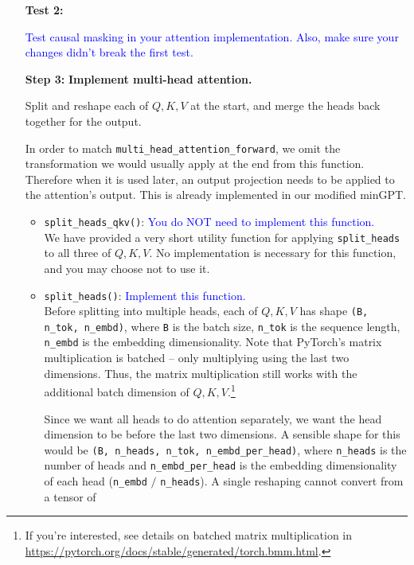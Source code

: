 \documentclass{article}
\begin{document}
\begin{enumerate}
        \item[\textbf{Test 2:}]

        \textcolor{blue}{Test causal masking in your attention implementation. Also, make sure your changes didn't break the first test.}
        
        \item[\textbf{Step 3:}] 
        \textbf{Implement multi-head attention.}
        
        Split and reshape each of $Q,K,V$ at the start, and merge the heads back
        together for the output.
        
        In order to match \verb|multi_head_attention_forward|, we omit the
        transformation we would usually apply at the end from this function.
        Therefore when it is used later, an output projection needs to be
        applied to the attention's output. This is already implemented in our
        modified minGPT.


        \begin{itemize}
        \item \verb|split_heads_qkv()|: \textcolor{blue}{You do NOT need to
        implement this function.} \\
        We have provided a very short utility function for applying
        \verb|split_heads| to all three of $Q, K, V$. No implementation is
        necessary for this function, and you may choose not to use it.
        
        \item \verb|split_heads()|: \textcolor{blue}{Implement this function.}
        \\
        Before splitting into multiple heads, each of $Q,K,V$ has shape
        \verb|(B, n_tok, n_embd)|, where \verb|B| is the batch size,
        \verb|n_tok| is the sequence length, \verb|n_embd| is the embedding
        dimensionality. Note that PyTorch's matrix multiplication is batched --
        only multiplying using the last two dimensions. Thus, the matrix
        multiplication still works with the additional batch dimension of
        $Q,K,V$.\footnote{If you're interested, see details on batched matrix
        multiplication in
        \url{https://pytorch.org/docs/stable/generated/torch.bmm.html}.}
        
        Since we want all heads to do attention separately, we want the head
        dimension to be before the last two dimensions. A sensible shape for
        this would be \verb|(B, n_heads, n_tok, n_embd_per_head)|, where
        \verb|n_heads| is the number of heads and \verb|n_embd_per_head| is the
        embedding dimensionality of each head (\verb|n_embd| $/$
        \verb|n_heads|). A single reshaping cannot convert from a tensor of
        

\end{itemize}
\end{enumerate}
\end{document}
